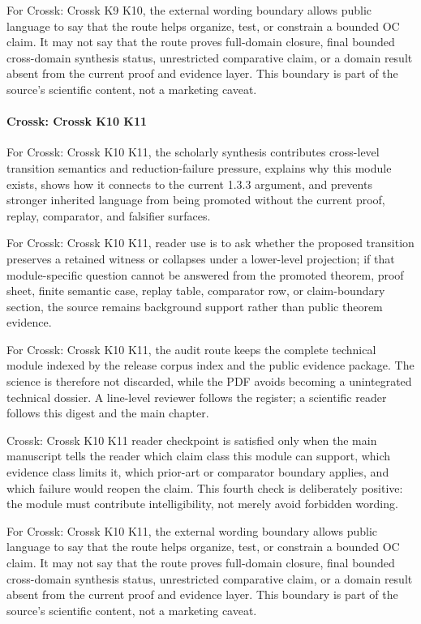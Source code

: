 For Crossk: Crossk K9 K10, the external wording boundary allows public language to say that the route helps organize, test, or constrain a bounded OC claim. It may not say that the route proves full-domain closure, final bounded cross-domain synthesis status, unrestricted comparative claim, or a domain result absent from the current proof and evidence layer. This boundary is part of the source's scientific content, not a marketing caveat.


\paragraph{Crossk: Crossk K10 K11}

For Crossk: Crossk K10 K11, the scholarly synthesis contributes cross-level transition semantics and reduction-failure pressure, explains why this module exists, shows how it connects to the current 1.3.3 argument, and prevents stronger inherited language from being promoted without the current proof, replay, comparator, and falsifier surfaces.


For Crossk: Crossk K10 K11, reader use is to ask whether the proposed transition preserves a retained witness or collapses under a lower-level projection; if that module-specific question cannot be answered from the promoted theorem, proof sheet, finite semantic case, replay table, comparator row, or claim-boundary section, the source remains background support rather than public theorem evidence.


For Crossk: Crossk K10 K11, the audit route keeps the complete technical module indexed by the release corpus index and the public evidence package. The science is therefore not discarded, while the PDF avoids becoming a unintegrated technical dossier. A line-level reviewer follows the register; a scientific reader follows this digest and the main chapter.


Crossk: Crossk K10 K11 reader checkpoint is satisfied only when the main manuscript tells the reader which claim class this module can support, which evidence class limits it, which prior-art or comparator boundary applies, and which failure would reopen the claim. This fourth check is deliberately positive: the module must contribute intelligibility, not merely avoid forbidden wording.


For Crossk: Crossk K10 K11, the external wording boundary allows public language to say that the route helps organize, test, or constrain a bounded OC claim. It may not say that the route proves full-domain closure, final bounded cross-domain synthesis status, unrestricted comparative claim, or a domain result absent from the current proof and evidence layer. This boundary is part of the source's scientific content, not a marketing caveat.


